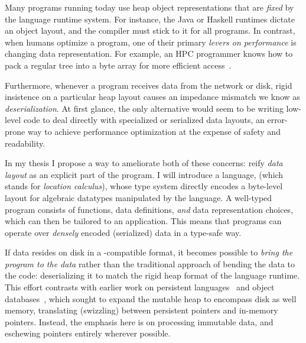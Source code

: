 Many programs running today use heap object representations that are {\em fixed}
by the language runtime system.
For instance, the Java or Haskell runtimes dictate an object layout, and the
compiler must stick to it for all programs.
%
In contrast, when humans optimize a program, one of their primary {\em levers on
performance} is changing data representation.  For example, an HPC programmer
knows how to pack a regular tree into a byte array for more efficient
access~\cite{makino90,goldfarb13sc,Meyerovich2011}.

Furthermore, whenever a program receives data from the network or
disk, rigid insistence on a particular heap layout causes an impedance mismatch
we know as {\em deserialization}.
%
%
At first glance, the only alternative would seem to be writing low-level code to
deal directly with specialized or serialized data layouts, an error-prone way to
achieve performance optimization at the expense of safety and readability.

In my thesis I propose a way to ameliorate both of these concerns: reify {\em
data layout} as an explicit part of the program. I will introduce a language,
\ourcalc (which stands for {\em location calculus}), whose type system directly
encodes a byte-level layout for algebraic datatypes manipulated by the language.
%
A well-typed program consists of functions, data definitions, {\em and}
data representation choices, which
can then be tailored to an application.
%
This means that programs can operate over {\em densely}
encoded (serialized) data in a type-safe way.
%

{If data resides on disk in a \ourcalc-compatible format}, it becomes
possible to {\em bring the program to the data} rather than the traditional
approach of bending the data to the code: deserializing it to match the rigid
heap format of the language runtime.
{This effort contrasts with earlier work on persistent
languages~\cite{persistent-java,persistent-objects-thor} and object databases~\cite{object-fault-handling},
which sought to expand the mutable heap to encompass disk as well memory,
translating (swizzling) between persistent pointers and in-memory pointers.  Instead, the
emphasis here is on processing immutable data, and eschewing pointers entirely
wherever possible.}

